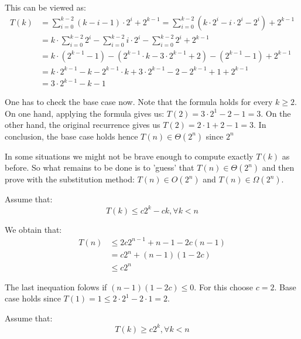 \documentclass{article}
\renewcommand{\leq}{\leqslant}
\renewcommand{\geq}{\geqslant}
\begin{document}
This can be viewed as:
\begin{equation*}
\label{eq-expo2}
\begin{split}
T(k)&= \sum_{i=0}^{k-2}(k - i - 1) \cdot 2^{i} + 2^{k-1} = \sum_{i=0}^{k-2}(k \cdot 2^{i} - i \cdot 2^{i} - 2^{i}) + 2^{k-1} \\
	&= k \cdot \sum_{i=0}^{k-2} 2^{i} - \sum_{i=0}^{k-2} i \cdot 2^{i} - \sum_{i=0}^{k-2}2^i + 2^{k-1} \\
	&=  k \cdot (2^{k-1} - 1) - (2^{k-1}\cdot k - 3\cdot 2^{k-1}+2) - (2^{k-1} - 1) + 2^{k-1} \\
	&= k \cdot 2^{k-1} - k - 2^{k-1}\cdot k + 3\cdot 2^{k-1}-2 -2^{k-1} + 1 + 2^{k-1}\\
	&= 3 \cdot 2^{k-1} - k - 1
\end{split}
\end{equation*}

One has to check the base case now. Note that the formula holds for every $k \geq 2$. On one hand, applying the formula gives us:
$T(2) = 3 \cdot 2^{1} - 2 - 1 = 3$.
On the other hand, the original recurrence gives us $T(2) = 2 \cdot 1 + 2 - 1 = 3$. In conclusion, the base case holds hence $T(n) \in \Theta(2^n)$ since $2^{n}$


In some situations we might not be brave enough to compute exactly $T(k)$ as before. So what remains to be done is to 'guess' that $T(n) \in \Theta(2^n)$ and then prove with the substitution method: $T(n) \in O(2^n)$ and $T(n) \in \Omega(2^n)$.

Assume that:
\begin{equation*}
\label{eq-expo}
T(k) \leq c2^k - ck, \forall k < n
\end{equation*}

We obtain that:
\begin{equation*}
\label{eq-expo2}
\begin{split}
T(n) & \leq 2c2^{n-1}+n-1 - 2c(n-1) \\
	&= c2^{n} + (n-1)(1 - 2c) \\
	& \leq c2^{n}
\end{split}
\end{equation*}

The last inequation folows if $(n-1)(1-2c) \leq 0$. For this choose $c=2$. Base case holds since $T(1) = 1 \leq 2 \cdot 2^{1} - 2\cdot 1=2$.

Assume that:
\begin{equation*}
\label{eq-expo3}
T(k) \geq c2^k, \forall k < n
\end{equation*}
\end{document}
